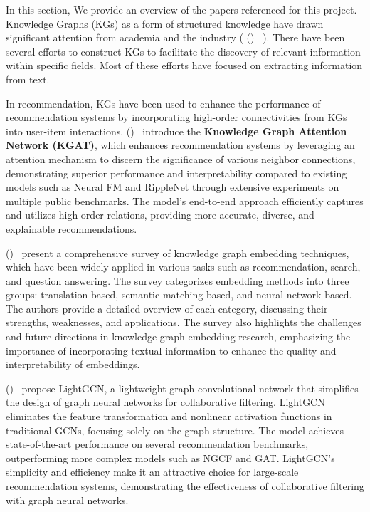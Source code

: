 \documentclass[11pt,a4paper,openany,oneside,titlepage]{article}
\newcommand{\citewithnumber}[1]{%
  \citeauthor{#1} (\citeyear{#1})~\cite{#1}%
}
\begin{document}
In this section, We provide an overview of the papers referenced for this project. Knowledge Graphs (KGs) as a form of structured knowledge have drawn significant attention from academia and the industry (\citewithnumber{ji2022survey}). There have been several efforts to construct KGs to facilitate the discovery of relevant information within specific fields. Most of these efforts have focused on extracting information from text.

In recommendation, KGs have been used to enhance the performance of recommendation systems by incorporating high-order connectivities from KGs into user-item interactions. \citewithnumber {wang2019kgat} introduce the \textbf{Knowledge Graph Attention Network (KGAT)}, which enhances recommendation systems by leveraging an attention mechanism to discern the significance of various neighbor connections, demonstrating superior performance and interpretability compared to existing models such as Neural FM and RippleNet through extensive experiments on multiple public benchmarks. The model's end-to-end approach efficiently captures and utilizes high-order relations, providing more accurate, diverse, and explainable recommendations.

\citewithnumber {guo2020survey} present a comprehensive survey of knowledge graph embedding techniques, which have been widely applied in various tasks such as recommendation, search, and question answering. The survey categorizes embedding methods into three groups: translation-based, semantic matching-based, and neural network-based. The authors provide a detailed overview of each category, discussing their strengths, weaknesses, and applications. The survey also highlights the challenges and future directions in knowledge graph embedding research, emphasizing the importance of incorporating textual information to enhance the quality and interpretability of embeddings.

\citewithnumber {he2020lightgcn} propose LightGCN, a lightweight graph convolutional network that simplifies the design of graph neural networks for collaborative filtering. LightGCN eliminates the feature transformation and nonlinear activation functions in traditional GCNs, focusing solely on the graph structure. The model achieves state-of-the-art performance on several recommendation benchmarks, outperforming more complex models such as NGCF and GAT. LightGCN's simplicity and efficiency make it an attractive choice for large-scale recommendation systems, demonstrating the effectiveness of collaborative filtering with graph neural networks.
\end{document}
